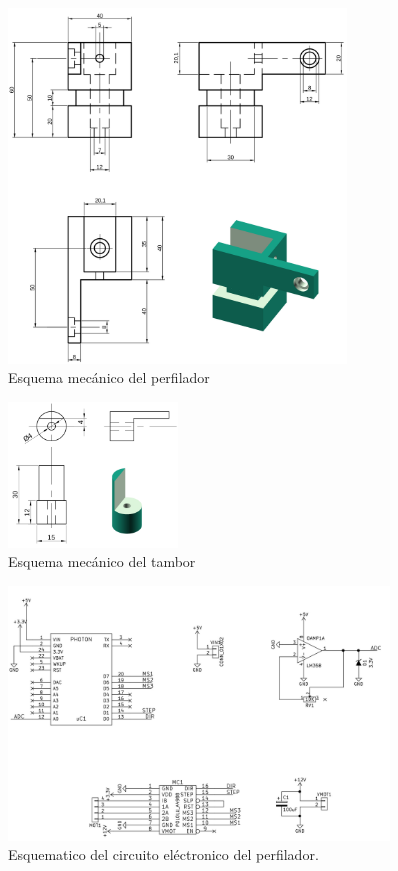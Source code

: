 \documentclass[12pt,a4paper]{article}
\begin{document}
\begin{figure}[H]
  \centering
  \includegraphics[width=0.8\textwidth]{fig/perfilador}
  \caption{Esquema mecánico del perfilador}
  \label{fig:perfilador}
\end{figure}

\begin{figure}[H]
  \centering
  \includegraphics[width=0.4\textwidth]{fig/tambor}
  \caption{Esquema mecánico del tambor}
  \label{fig:perfilador}
\end{figure}

\clearpage

\begin{figure}[H]
  \centering
  \includegraphics[width=0.9\textwidth]{fig/circuito_esquematico}
  \caption{Esquematico del circuito eléctronico del perfilador.}
  \label{fig:circuito_esquematico}
\end{figure}
\end{document}
